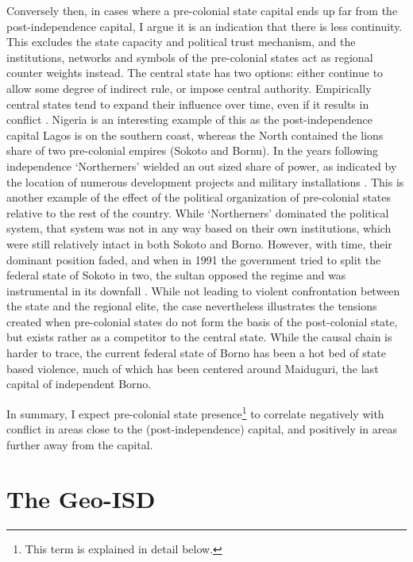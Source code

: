 \documentclass[12pt]{article}
\begin{document}
Conversely then, in cases where a pre-colonial state capital ends up far from
the post-independence capital, I argue it is an indication that there is less
continuity. This excludes the state capacity and political trust mechanism, and
the institutions, networks and symbols of the pre-colonial states act as
regional counter weights instead. The central state has two options: either
continue to allow some degree of indirect rule, or impose central authority.
Empirically central states tend to expand their influence over time, even if it
results in conflict \citep{Ying_2020}. Nigeria is an interesting example of this
as the post-independence capital Lagos is on the southern coast, whereas the
North contained the lions share of two pre-colonial empires (Sokoto and Bornu).
In the years following independence `Northerners' wielded an out sized share of
power, as indicated by the location of numerous development projects and
military installations \citep{Bates2008a}. This is another example of the effect
of the political organization of pre-colonial states relative to the rest of the
country. While `Northerners' dominated the political system, that system was not
in any way based on their own institutions, which were still relatively intact
in both Sokoto and Borno. However, with time, their dominant position faded, and
when in 1991 the government tried to split the federal state of Sokoto in two,
the sultan opposed the regime and was instrumental in its downfall
\citep{HiribarrenVincent2017AHoB}. While not leading to violent confrontation
between the state and the regional elite, the case nevertheless illustrates the
tensions created when pre-colonial states do not form the basis of the
post-colonial state, but exists rather as a competitor to the central state.
While the causal chain is harder to trace, the current federal state of Borno
has been a hot bed of state based violence, much of which has been centered
around Maiduguri, the last capital of independent Borno.

In summary, I expect pre-colonial state presence\footnote{This term is explained
in detail below.} to correlate negatively with conflict in areas close to the
(post-independence) capital, and positively in areas further away from the
capital.

\section{The Geo-ISD}
\end{document}

